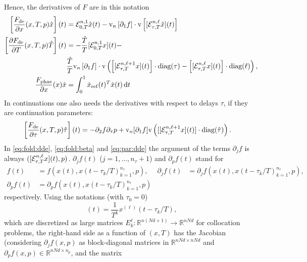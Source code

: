 \documentclass[11pt]{scrartcl}
\renewcommand{\d}{\mathop{}\!\mathrm{d}}
\newcommand{\R}{\mathbb{R}}
\newcommand{\mlvar}[1]{\lstinline[keywordstyle=\color{var}]!#1!}
\newcommand{\blist}[1]{\mbox{\lstinline!#1!}}
\renewcommand{\vec}{\blist{v}}
\newcommand{\diag}{\mbox{\mlvar{diag}}}
\begin{document}
Hence, the derivatives of $F$ are in this notation
\begin{align}
  \label{eq:fold:dde}
  \left[\frac{F_\mathrm{de}}{\partial x}(x,T,p)\hat{x}\right](t)&={\cal E}^{n,1}_{0,T}\hat{x}(t)-
  \vec_n\left[\partial_1f\right]\cdot \vec\left[[{\cal E}^{n,\ell}_{\tau,T}\hat{x}](t)\right]\\
  \label{eq:fold:beta}
   \left[\frac{\partial F_\mathrm{de}}{\partial T}(x,T,p)\hat{T}\right](t)&= -\frac{\hat{T}}{T}[{\cal E}^{n,1}_{0,T}x](t)-
   \\\nonumber
   &\frac{\hat{T}}{T}\vec_n\left[\partial_1f\right]\cdot\vec \left(
     \left[[{\cal E}^{n,\ell+1}_{\tau,T}x](t)\right]\cdot\diag(\tau)
     -\left[[{\cal E}^{n,\ell}_{\tau,T}x](t)\right]\cdot\diag(\ell)
   \right)\mbox{,}\\
  \label{eq:fold:phas0}
  \frac{F_\mathrm{phas}}{\partial x}(x)\hat{x}&=\int_0^1\dot x_\mathrm{ref}(t)^T\hat{x}(t)\d t
\end{align}
In continuations one also needs the derivatives with respect to
delays $\tau$, if they are continuation parameters:
\begin{align}
    \label{eq:par:dde}
    \left[\frac{F_\mathrm{de}}{\partial \tau}(x,T,p)\hat{\tau}\right](t)&=-
    \partial_2f\partial_{\tau} p+
    \vec_n[\partial_1 f]\vec \left([[{\cal E}^{n,\ell+1}_{\tau,T}x](t)]\cdot\diag(\hat{\tau})\right)\mbox{.}
\end{align}
In \eqref{eq:fold:dde}, \eqref{eq:fold:beta} and \eqref{eq:par:dde}
the argument of the terms $\partial_jf$ is always
$([{\cal E}^{n,\ell}_{\tau,T}x](t),p)$.  $\partial_jf(t)$
($j=1,\ldots,n_\tau+1$) and $\partial_pf(t)$ stand for
\begin{align}\label{eq:ftdef}
  f(t)&=f\left(x(t),x(t-\tau_k/T)_{k=1}^{n_\tau},p\right)\mbox{,}&
  \partial_jf(t)&=\partial_jf\left(x(t),x(t-\tau_k/T)_{k=1}^{n_\tau},p\right)\mbox{,}\\
  \partial_pf(t)&=\partial_pf\left(x(t),x(t-\tau_k/T)_{k=1}^{n_\tau},p\right)
\end{align}
respectively.  Using the notations (with $\tau_0=0$)
\begin{displaymath}
  [E^\ell_kx](t)=\frac{1}{T^k}x^{(\ell)}(t-\tau_k/T)\mbox{,}
\end{displaymath}
which are discretized as large matrices
$E^\ell_k:\R^{n(Nd+1)}\to\R^{nNd}$ for collocation problems, the
right-hand side as a function of $(x,T)$ has the Jacobian (considering
$\partial_jf(x,p)$ as block-diagonal matrices in $\R^{nNd\times nNd}$
and $\partial_pf(x,p)\in\R^{nNd\times n_p}$, and the matrix
\end{document}
